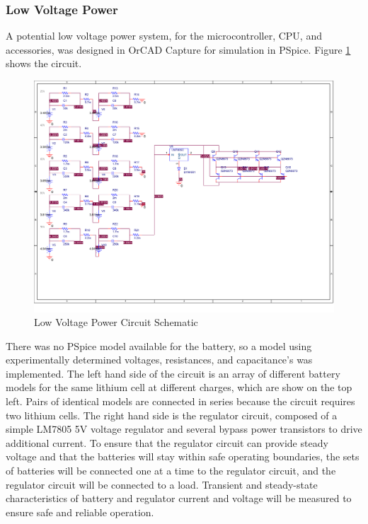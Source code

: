\documentclass[letterpaper,12pt]{article}
\begin{document}
\subsubsection{Low Voltage Power}\label{power-lv-sec}
A potential low voltage power system, for the microcontroller, CPU, and accessories, was designed in OrCAD Capture for simulation in PSpice. Figure \ref{power-lv} shows the circuit.
\begin{figure}[!htbp]\centering
  \includegraphics[width=\linewidth]{power.pdf}
  \caption{Low Voltage Power Circuit Schematic}
  \label{power-lv}
\end{figure}
There was no PSpice model available for the battery, so a model using experimentally determined voltages, resistances, and capacitance's was implemented. The left hand side of the circuit is an array of different battery models for the same lithium cell at different charges, which are show on the top left. Pairs of identical models are connected in series because the circuit requires two lithium cells. The right hand side is the regulator circuit, composed of a simple LM7805 5V voltage regulator and several bypass power transistors to drive additional current. To ensure that the regulator circuit can provide steady voltage and that the batteries will stay within safe operating boundaries, the sets of batteries will be connected one at a time to the regulator circuit, and the regulator circuit will be connected to a load. Transient and steady-state characteristics of battery and regulator current and voltage will be measured to ensure safe and reliable operation.
\end{document}
